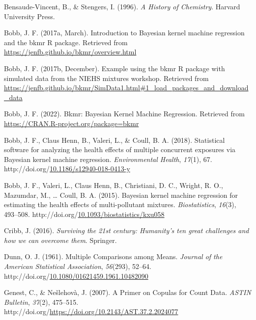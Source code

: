 \documentclass[12pt, twoside]{amherstthesis}
\newenvironment{CSLReferences}[2]%
  {}%
  {\par}
\begin{document}
\begin{CSLReferences}{1}{0}
\leavevmode{}%
Bensaude-Vincent, B., \& Stengers, I. (1996). \emph{A {History} of {Chemistry}}. Harvard University Press.

\leavevmode{}%
Bobb, J. F. (2017a, March). Introduction to {Bayesian} kernel machine regression and the bkmr {R} package. Retrieved from \url{https://jenfb.github.io/bkmr/overview.html}

\leavevmode{}%
Bobb, J. F. (2017b, December). Example using the bkmr {R} package with simulated data from the {NIEHS} mixtures workshop. Retrieved from \url{https://jenfb.github.io/bkmr/SimData1.html\#1_load_packages_and_download_data}

\leavevmode{}%
Bobb, J. F. (2022). Bkmr: {Bayesian} {Kernel} {Machine} {Regression}. Retrieved from \url{https://CRAN.R-project.org/package=bkmr}

\leavevmode{}%
Bobb, J. F., Claus Henn, B., Valeri, L., \& Coull, B. A. (2018). Statistical software for analyzing the health effects of multiple concurrent exposures via {Bayesian} kernel machine regression. \emph{Environmental Health}, \emph{17}(1), 67. http://doi.org/\href{https://doi.org/10.1186/s12940-018-0413-y}{10.1186/s12940-018-0413-y}

\leavevmode{}%
Bobb, J. F., Valeri, L., Claus Henn, B., Christiani, D. C., Wright, R. O., Mazumdar, M., \ldots{} Coull, B. A. (2015). Bayesian kernel machine regression for estimating the health effects of multi-pollutant mixtures. \emph{Biostatistics}, \emph{16}(3), 493--508. http://doi.org/\href{https://doi.org/10.1093/biostatistics/kxu058}{10.1093/biostatistics/kxu058}

\leavevmode{}%
Cribb, J. (2016). \emph{Surviving the 21st century: {Humanity}'s ten great challenges and how we can overcome them}. Springer.

\leavevmode{}%
Dunn, O. J. (1961). Multiple {Comparisons} among {Means}. \emph{Journal of the American Statistical Association}, \emph{56}(293), 52--64. http://doi.org/\href{https://doi.org/10.1080/01621459.1961.10482090}{10.1080/01621459.1961.10482090}

\leavevmode{}%
Genest, C., \& Nešlehovà, J. (2007). A {Primer} on {Copulas} for {Count} {Data}. \emph{ASTIN Bulletin}, \emph{37}(2), 475--515. http://doi.org/\url{https://doi.org/10.2143/AST.37.2.2024077}


\end{CSLReferences}
\end{document}
